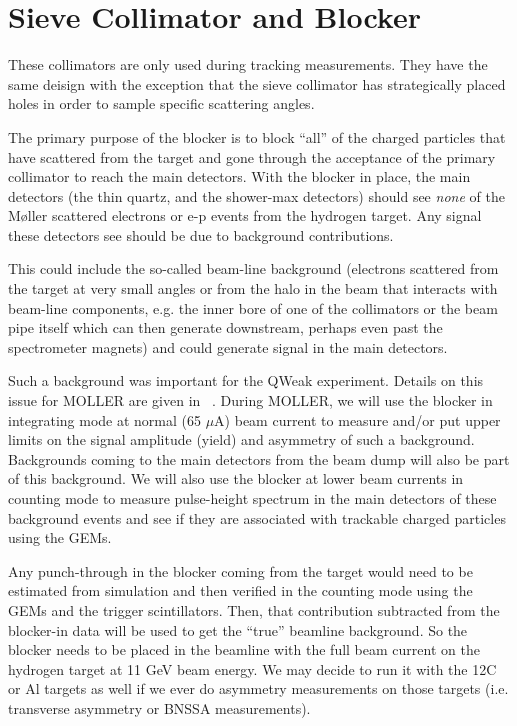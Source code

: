 \section{Sieve Collimator and Blocker}

These collimators are only used during tracking measurements. They have the same deisign with the exception that the sieve collimator has strategically placed holes in order to sample specific scattering angles.

The primary purpose of the blocker is to block ``all'' of the charged particles that have scattered from the target and gone through the acceptance of the primary collimator to reach the main detectors. With the blocker in place, the main detectors (the thin quartz, and the shower-max detectors) should see \textit{none} of the M\o ller scattered electrons or e-p events from the hydrogen target. Any signal these detectors see should be due to background contributions. 


This could include the so-called beam-line background (electrons scattered from the target at very small angles or from the halo in the beam that interacts with beam-line components, e.g. the inner bore of one of the collimators or the beam pipe itself which can then generate downstream, perhaps even past the spectrometer magnets) and could generate signal in the main detectors. 

Such a background was important for the QWeak experiment. Details on this issue for MOLLER are given in ~\cite{beamlinebackground}. During MOLLER, we will use the blocker in integrating mode at normal (65 $\mu$A) beam current to measure and/or put upper limits on the signal amplitude (yield) and asymmetry of such a background. Backgrounds coming to the main detectors from the beam dump will also be part of this background. We will also use the blocker at lower beam currents in counting mode to measure pulse-height spectrum in the main detectors of these background events and see if they are associated with trackable charged particles using the GEMs. 

Any punch-through in the blocker coming from the target would need to be estimated from simulation and then verified in the counting mode using the GEMs and the trigger scintillators. Then, that contribution subtracted from the blocker-in data will be used to get the ``true'' beamline background. So the blocker needs to be placed in the beamline with the full beam current on the hydrogen target at 11 GeV beam energy. We may decide to run it with the 12C or Al targets as well if we ever do asymmetry measurements on those targets (i.e. transverse asymmetry or BNSSA measurements).

